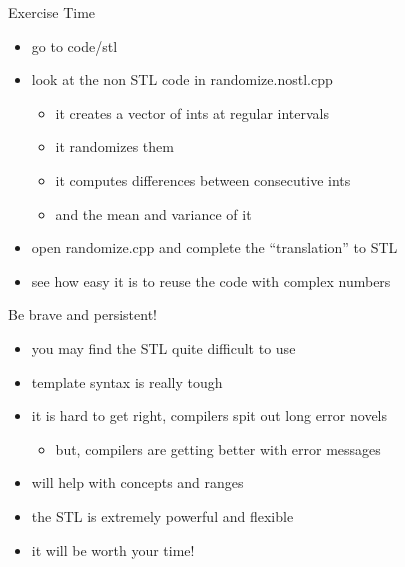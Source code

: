 \begin{frame}[fragile]
  \begin{alertblock}{Exercise Time}
    \begin{itemize}
    \item go to code/stl
    \item look at the non STL code in randomize.nostl.cpp
      \begin{itemize}
        \item it creates a vector of ints at regular intervals
        \item it randomizes them
        \item it computes differences between consecutive ints
        \item and the mean and variance of it
      \end{itemize}
    \item open randomize.cpp and complete the ``translation'' to STL
    \item see how easy it is to reuse the code with complex numbers
    \end{itemize}
  \end{alertblock}
\end{frame}

\begin{frame}[fragile]
  \begin{exampleblock}{Be brave and persistent!}
    \begin{itemize}
    \item you may find the STL quite difficult to use
    \item template syntax is really tough
    \item it is hard to get right, compilers spit out long error novels
    \begin{itemize}
      \item but, compilers are getting better with error messages
    \end{itemize}
    \item {} will help with concepts and ranges
    \item the STL is extremely powerful and flexible
    \item it will be worth your time!
    \end{itemize}
  \end{exampleblock}
\end{frame}
